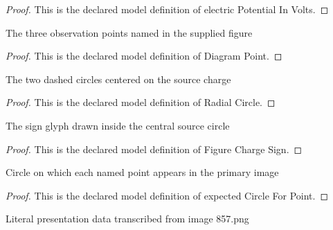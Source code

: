 \begin{proof}
  This is the declared model definition of electric Potential In Volts.
\end{proof}
\begin{definition}
  \label{def:physics:phyx-mini-0857:phyxminiproblems-problemphyxmini0857-diagrampoint}
  The three observation points named in the supplied figure
\end{definition}
\begin{proof}
  This is the declared model definition of Diagram Point.
\end{proof}
\begin{definition}
  \label{def:physics:phyx-mini-0857:phyxminiproblems-problemphyxmini0857-radialcircle}
  The two dashed circles centered on the source charge
\end{definition}
\begin{proof}
  This is the declared model definition of Radial Circle.
\end{proof}
\begin{definition}
  \label{def:physics:phyx-mini-0857:phyxminiproblems-problemphyxmini0857-figurechargesign}
  The sign glyph drawn inside the central source circle
\end{definition}
\begin{proof}
  This is the declared model definition of Figure Charge Sign.
\end{proof}
\begin{definition}
  \label{def:physics:phyx-mini-0857:phyxminiproblems-problemphyxmini0857-expectedcircleforpoint}
  Circle on which each named point appears in the primary image
\end{definition}
\begin{proof}
  This is the declared model definition of expected Circle For Point.
\end{proof}
\begin{definition}
  \label{def:physics:phyx-mini-0857:phyxminiproblems-problemphyxmini0857-pointchargepotentialfigure}
  Literal presentation data transcribed from image 857.png
\end{definition}
